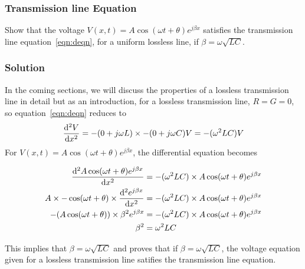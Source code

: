 \begin{exmp}
\subsubsection*{Transmission line Equation}
Show that the voltage $V(x,t) = A\cos(\omega t+\theta)e^{j\beta x}$ satisfies the transmission line equation~\eqref{eqn:deqn}, for a uniform lossless line, if $\beta = \omega\sqrt{LC}$.

\subsubsection*{Solution}
In the coming sections, we will discuss the properties of a lossless transmission line in detail but as an introduction, for a lossless transmission line, $R = G = 0$, so equation~\eqref{eqn:deqn} reduces to
\begin{dmath*}
\derivative[2]{V}{x} = -(0 + j\omega L)\times -(0 + j\omega C)V
= -(\omega^2 LC)V
\end{dmath*}
For $V(x,t) = A\cos(\omega t+\theta)e^{j\beta x}$, the differential equation becomes
\begin{footnotesize}\begin{align}
\derivative[2]{A\cos(\omega t+\theta)e^{j\beta x}}{x} &= -(\omega^2 LC)\times A\cos(\omega t+\theta)e^{j\beta x}\\
A\times -\cos(\omega t+\theta)\times\derivative[2]{e^{j\beta x}}{x} &= -(\omega^2 LC)\times A\cos(\omega t+\theta)e^{j\beta x}\\
-(A\cos(\omega t+\theta))\times\beta^2e^{j\beta x} &= -(\omega^2 LC)\times A\cos(\omega t+\theta)e^{j\beta x}\\
\beta^2 &= \omega^2 LC
\end{align}
\end{footnotesize}
This implies that $\beta = \omega\sqrt{LC}$ and proves that  if $\beta = \omega\sqrt{LC}$, the voltage equation given for a lossless transmission line satifies the transmission line equation.
\end{exmp}

